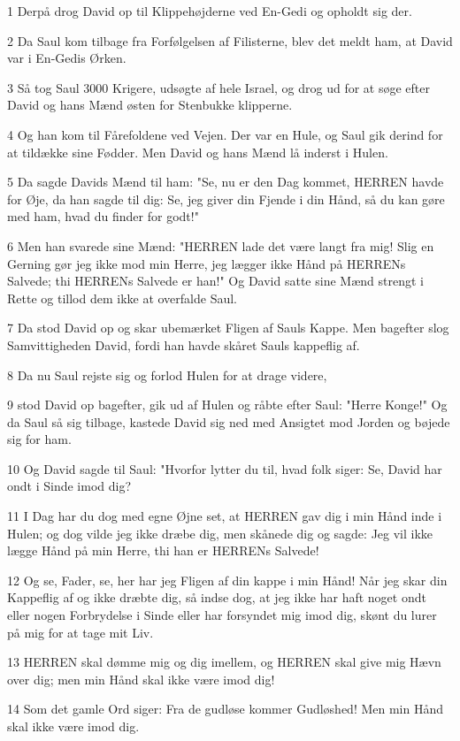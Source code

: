 \par 1 Derpå drog David op til Klippehøjderne ved En-Gedi og opholdt sig der.
\par 2 Da Saul kom tilbage fra Forfølgelsen af Filisterne, blev det meldt ham, at David var i En-Gedis Ørken.
\par 3 Så tog Saul 3000 Krigere, udsøgte af hele Israel, og drog ud for at søge efter David og hans Mænd østen for Stenbukke klipperne.
\par 4 Og han kom til Fårefoldene ved Vejen. Der var en Hule, og Saul gik derind for at tildække sine Fødder. Men David og hans Mænd lå inderst i Hulen.
\par 5 Da sagde Davids Mænd til ham: "Se, nu er den Dag kommet, HERREN havde for Øje, da han sagde til dig: Se, jeg giver din Fjende i din Hånd, så du kan gøre med ham, hvad du finder for godt!"
\par 6 Men han svarede sine Mænd: "HERREN lade det være langt fra mig! Slig en Gerning gør jeg ikke mod min Herre, jeg lægger ikke Hånd på HERRENs Salvede; thi HERRENs Salvede er han!" Og David satte sine Mænd strengt i Rette og tillod dem ikke at overfalde Saul.
\par 7 Da stod David op og skar ubemærket Fligen af Sauls Kappe. Men bagefter slog Samvittigheden David, fordi han havde skåret Sauls kappeflig af.
\par 8 Da nu Saul rejste sig og forlod Hulen for at drage videre,
\par 9 stod David op bagefter, gik ud af Hulen og råbte efter Saul: "Herre Konge!" Og da Saul så sig tilbage, kastede David sig ned med Ansigtet mod Jorden og bøjede sig for ham.
\par 10 Og David sagde til Saul: "Hvorfor lytter du til, hvad folk siger: Se, David har ondt i Sinde imod dig?
\par 11 I Dag har du dog med egne Øjne set, at HERREN gav dig i min Hånd inde i Hulen; og dog vilde jeg ikke dræbe dig, men skånede dig og sagde: Jeg vil ikke lægge Hånd på min Herre, thi han er HERRENs Salvede!
\par 12 Og se, Fader, se, her har jeg Fligen af din kappe i min Hånd! Når jeg skar din Kappeflig af og ikke dræbte dig, så indse dog, at jeg ikke har haft noget ondt eller nogen Forbrydelse i Sinde eller har forsyndet mig imod dig, skønt du lurer på mig for at tage mit Liv.
\par 13 HERREN skal dømme mig og dig imellem, og HERREN skal give mig Hævn over dig; men min Hånd skal ikke være imod dig!
\par 14 Som det gamle Ord siger: Fra de gudløse kommer Gudløshed! Men min Hånd skal ikke være imod dig.
